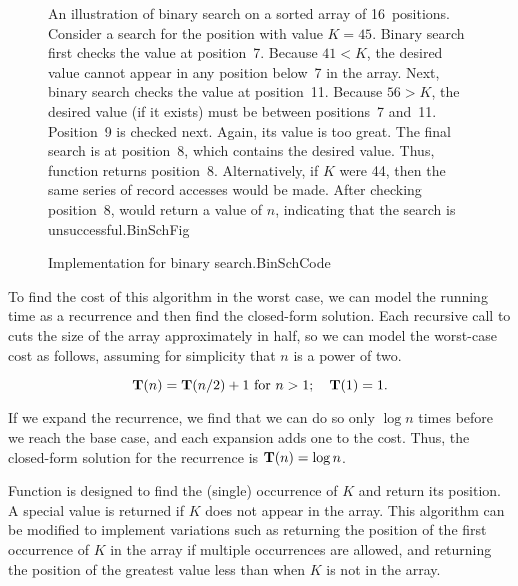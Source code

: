 \begin{figure}

{An illustration of binary search on a sorted array of 16~positions.
Consider a search for the position with value \(K = 45\).
Binary search first checks the value at position~7.
Because \(41 < K\), the desired value cannot
appear in any position below~7 in the array.
Next, binary search checks the value at position~11.
Because \(56 > K\), the desired value (if it exists) must be between
positions~7 and~11.
Position~9 is checked next.
Again, its value is too great.
The final search is at position~8, which contains the desired value.
Thus, function  returns position~8.
Alternatively, if \(K\) were 44, then the same series of record accesses
would be made.
After checking position~8,  would return a value of
\(n\), indicating that the search is unsuccessful.}{BinSchFig}
\bigskip
\end{figure}

\begin{figure}

\vspace{-\bigskipamount}
{Implementation for binary search.}{BinSchCode}
\end{figure}

To find the cost of this algorithm in the worst case, we can model the
running time as a recurrence and then find the closed-form solution.
Each recursive call to  cuts the size of the array
approximately in half, so we can model the worst-case cost as follows,
assuming for simplicity that \(n\) is a power of two.

\[\mbox{$\textbf{T}(n)$} = \mbox{$\textbf{T}(n/2)$} + 1\ \mbox{for}\ n>1; \quad \mbox{$\textbf{T}(1)$} = 1.\]

If we expand the recurrence, we find that we can do so only
\(\log n\) times before we reach the base case, and each expansion
adds one to the cost.
Thus, the closed-form solution for the recurrence is \(\mbox{$\textbf{T}(n)$} = \log n\).

Function  is designed to find the
(single) occurrence of \(K\) and return its position.
A special value is returned if \(K\) does not appear in the array.
This algorithm can be modified to implement variations 
such as returning the position of the first
occurrence of \(K\) in the array if multiple occurrences are allowed,
and returning the position of the greatest value less than 
when \(K\) is not in the array.

